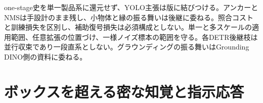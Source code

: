 \documentclass[lualatex,a4paper,10pt]{jlreq}
\begin{document}
\begin{claimboundary}[本節の読解上の境界]
\noindent one-stage史を単一製品系に還元せず、YOLO主張は版に結びつける。アンカーとNMSは手設計のまま残し、小物体と縁の振る舞いは後継に委ねる。照合コストと訓練損失を区別し、補助復号損失は必須構成としない。単一と多スケールの適用範囲、任意拡張の位置づけ、一様ノイズ標本の範囲を守る。各DETR後継枝は並行収束であり一段直系としない。グラウンディングの振る舞いはGrounding DINO側の資料に委ねる。\autocite{vmd005,vmd006,vmd007,vmd010,vmd011,vmd012,vmd123,vmd125,vmd008,vmd009,vmd124}\par
\end{claimboundary}

\Needspace{0.20\textheight}
\section{ボックスを超える密な知覚と指示応答}
\label{sec:p03}
\end{document}
